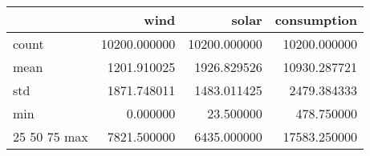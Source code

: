\begin{tabular}{lrrr}
\toprule
 & wind & solar & consumption \\
\midrule
count & 10200.000000 & 10200.000000 & 10200.000000 \\
mean & 1201.910025 & 1926.829526 & 10930.287721 \\
std & 1871.748011 & 1483.011425 & 2479.384333 \\
min & 0.000000 & 23.500000 & 478.750000 \\
25%
50%
75%
max & 7821.500000 & 6435.000000 & 17583.250000 \\
\bottomrule
\end{tabular}
